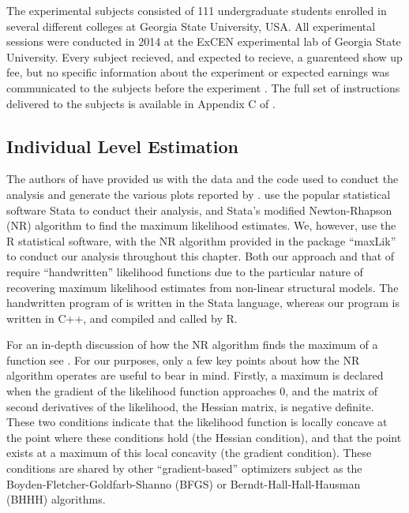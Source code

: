 \documentclass[../main.tex]{subfiles}
\begin{document}
The experimental subjects consisted of 111 undergraduate students enrolled in several different colleges at Georgia State University, USA.
All experimental sessions were conducted in 2014 at the ExCEN experimental lab of Georgia State University. 
Every subject recieved, and expected to recieve, a guarenteed  show up fee, but no specific information about the experiment or expected earnings was communicated to the subjects before the experiment \parencite[98]{Harrison2016}.
The full set of instructions delivered to the subjects is available in Appendix C of \textcite{Harrison2016}.

\subsection{Individual Level Estimation}

The authors of \textcite{Harrison2016} have provided us with the data and the code used to conduct the analysis and generate the various plots reported by \textcite{Harrison2016}.
\textcite{Harrison2016} use the popular statistical software Stata to conduct their analysis, and Stata's modified Newton-Rhapson (NR) algorithm to find the maximum likelihood estimates.
We, however, use the R statistical software, with the NR algorithm provided in the package \enquote{maxLik} to conduct our analysis throughout this chapter.
Both our approach and that of \textcite{Harrison2016} require \enquote{handwritten} likelihood functions due to the particular nature of recovering maximum likelihood estimates from non-linear structural models.
The handwritten program of \textcite{Harrison2016} is written in the Stata language, whereas our program is written in C++, and compiled and called by R.

For an in-depth discussion of how the NR algorithm finds the maximum of a function see \textcite[213-219]{Train2002}.
For our purposes, only a few key points about how the NR algorithm operates are useful to bear in mind.
Firstly, a maximum is declared when the gradient of the likelihood function approaches 0, and the matrix of second derivatives of the likelihood, the Hessian matrix, is negative definite.
These two conditions indicate that the likelihood function is locally concave at the point where these conditions hold (the Hessian condition), and that the point exists at a maximum of this local concavity (the gradient condition).
These conditions are shared by other \enquote{gradient-based} optimizers subject as the Boyden-Fletcher-Goldfarb-Shanno (BFGS) or Berndt-Hall-Hall-Hausman (BHHH) algorithms.
\end{document}
